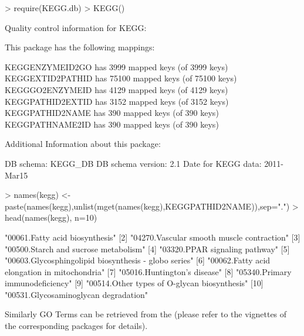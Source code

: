 \documentclass[11pt]{article}
\newcommand{\Rcode}[1]{{\texttt{\color{BrickRed}{#1}}}}
\renewenvironment{Schunk}{\vspace{\topsep}}{\vspace{\topsep}}
\begin{document}
\begin{Schunk}
\begin{Sinput}
> require(KEGG.db)
> KEGG()
\end{Sinput}
\begin{Soutput}
Quality control information for KEGG:


This package has the following mappings:

KEGGENZYMEID2GO has 3999 mapped keys (of 3999 keys)
KEGGEXTID2PATHID has 75100 mapped keys (of 75100 keys)
KEGGGO2ENZYMEID has 4129 mapped keys (of 4129 keys)
KEGGPATHID2EXTID has 3152 mapped keys (of 3152 keys)
KEGGPATHID2NAME has 390 mapped keys (of 390 keys)
KEGGPATHNAME2ID has 390 mapped keys (of 390 keys)


Additional Information about this package:

DB schema: KEGG_DB
DB schema version: 2.1
Date for KEGG data: 2011-Mar15
\end{Soutput}
\begin{Sinput}
> names(kegg) <- paste(names(kegg),unlist(mget(names(kegg),KEGGPATHID2NAME)),sep=".")
> head(names(kegg), n=10)
\end{Sinput}
\begin{Soutput}
 [1] "00061.Fatty acid biosynthesis"                      
 [2] "04270.Vascular smooth muscle contraction"           
 [3] "00500.Starch and sucrose metabolism"                
 [4] "03320.PPAR signaling pathway"                       
 [5] "00603.Glycosphingolipid biosynthesis - globo series"
 [6] "00062.Fatty acid elongation in mitochondria"        
 [7] "05016.Huntington's disease"                         
 [8] "05340.Primary immunodeficiency"                     
 [9] "00514.Other types of O-glycan biosynthesis"         
[10] "00531.Glycosaminoglycan degradation"                
\end{Soutput}
\end{Schunk}

Similarly GO Terms can be retrieved from the \Rcode{GO.db}
(please refer to the vignettes of the corresponding packages for details).
\end{document}
